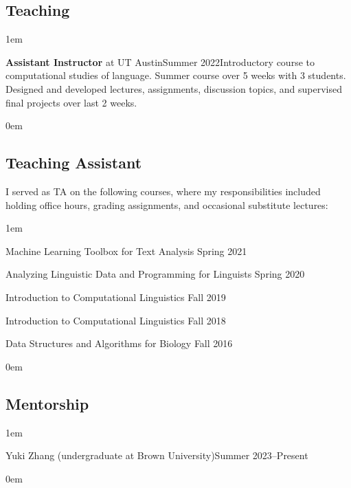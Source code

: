 \subsection{Teaching}
\vspace{-0.5\baselineskip}
\leftskip1em\relax

  {\textbf{Assistant Instructor} at UT Austin}{Summer 2022}{}{Introductory course to computational studies of language. Summer course over 5 weeks with 3 students. Designed and developed lectures, assignments, discussion topics, and supervised final projects over last 2 weeks.}

\leftskip0em\relax
  
\subsection{Teaching Assistant}

\quad I served as TA on the following courses, where my responsibilities included holding office hours, grading assignments, and occasional substitute lectures:

\leftskip1em\relax

\vspace{0.5\baselineskip}

\textbullet\enspace Machine Learning Toolbox for Text Analysis \hfill Spring 2021

\textbullet\enspace Analyzing Linguistic Data and Programming for Linguists \hfill Spring 2020

\textbullet\enspace Introduction to Computational Linguistics \hfill Fall 2019

\textbullet\enspace Introduction to Computational Linguistics \hfill Fall 2018

\textbullet\enspace Data Structures and Algorithms for Biology \hfill Fall 2016

\leftskip0em\relax

\subsection{Mentorship}
\vspace{-0.5\baselineskip}
\leftskip1em\relax

  {Yuki Zhang (undergraduate at Brown University)}{Summer 2023--Present}{}{}

\leftskip0em\relax
